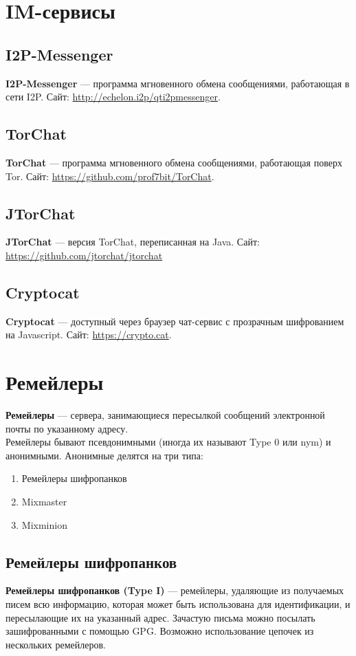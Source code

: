 \begin{enumerate}
\section{IM-сервисы}
\subsection{I2P-Messenger}
\textbf{I2P-Messenger} --- программа мгновенного обмена сообщениями, работающая в сети I2P. Сайт: \url{http://echelon.i2p/qti2pmessenger}.
\subsection{TorChat}
\textbf{TorChat} --- программа мгновенного обмена сообщениями, работающая поверх Tor. Сайт: \url{https://github.com/prof7bit/TorChat}.
\subsection{JTorChat}
\textbf{JTorChat} --- версия TorChat, переписанная на Java. Сайт: \url{https://github.com/jtorchat/jtorchat}
\subsection{Cryptocat}
\textbf{Cryptocat} --- доступный через браузер чат-сервис с прозрачным шифрованием на Javascript. Сайт: \url{https://crypto.cat}.

\section{Ремейлеры}
\textbf{Ремейлеры} --- сервера, занимающиеся пересылкой сообщений электронной почты по указанному адресу.\\
Ремейлеры бывают псевдонимными (иногда их называют Type 0 или nym) и анонимными. Анонимные делятся на три типа:
\begin{enumerate}
\item Ремейлеры шифропанков
\item Mixmaster 
\item Mixminion
\end{enumerate}
\subsection{Ремейлеры шифропанков}
\textbf{Ремейлеры шифропанков (Type I)} --- ремейлеры, удаляющие из получаемых писем всю информацию, которая может быть использована для идентификации, и пересылающие их на указанный адрес. Зачастую письма можно посылать зашифрованными с помощью GPG. Возможно использование цепочек из нескольких ремейлеров.

\end{enumerate}
